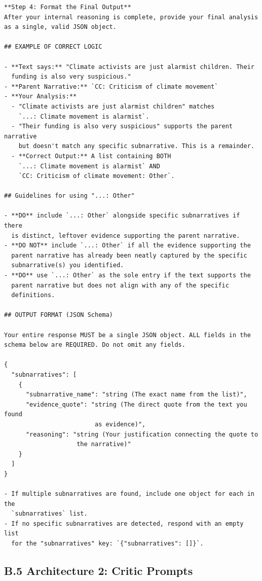 \begin{tcolorbox}[breakable, colback=gray!5, colframe=gray!75!black, title=Subnarrative System Prompt (Structure)]
\begin{verbatim}
**Step 4: Format the Final Output**
After your internal reasoning is complete, provide your final analysis 
as a single, valid JSON object.

## EXAMPLE OF CORRECT LOGIC

- **Text says:** "Climate activists are just alarmist children. Their 
  funding is also very suspicious."
- **Parent Narrative:** `CC: Criticism of climate movement`
- **Your Analysis:**
  - "Climate activists are just alarmist children" matches 
    `...: Climate movement is alarmist`.
  - "Their funding is also very suspicious" supports the parent narrative 
    but doesn't match any specific subnarrative. This is a remainder.
  - **Correct Output:** A list containing BOTH 
    `...: Climate movement is alarmist` AND 
    `CC: Criticism of climate movement: Other`.

## Guidelines for using "...: Other"

- **DO** include `...: Other` alongside specific subnarratives if there 
  is distinct, leftover evidence supporting the parent narrative.
- **DO NOT** include `...: Other` if all the evidence supporting the 
  parent narrative has already been neatly captured by the specific 
  subnarrative(s) you identified.
- **DO** use `...: Other` as the sole entry if the text supports the 
  parent narrative but does not align with any of the specific 
  definitions.

## OUTPUT FORMAT (JSON Schema)

Your entire response MUST be a single JSON object. ALL fields in the 
schema below are REQUIRED. Do not omit any fields.

{
  "subnarratives": [
    {
      "subnarrative_name": "string (The exact name from the list)",
      "evidence_quote": "string (The direct quote from the text you found 
                         as evidence)",
      "reasoning": "string (Your justification connecting the quote to 
                    the narrative)"
    }
  ]
}

- If multiple subnarratives are found, include one object for each in the 
  `subnarratives` list.
- If no specific subnarratives are detected, respond with an empty list 
  for the "subnarratives" key: `{"subnarratives": []}`.
\end{verbatim}
\end{tcolorbox}

\subsection{B.5 Architecture 2: Critic Prompts}
\label{app:b5-prompt-critic}


